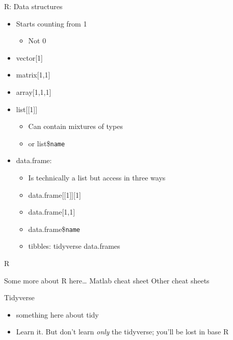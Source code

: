 \documentclass[
  ignorenonframetext,
]{beamer}
\providecommand{\tightlist}{%
  \setlength{\itemsep}{0pt}\setlength{\parskip}{0pt}}
\begin{document}
\begin{frame}[fragile]{R: Data structures}
\protect\hypertarget{r-data-structures}{}

\begin{itemize}
\tightlist
\item
  Starts counting from 1

  \begin{itemize}
  \tightlist
  \item
    Not 0
  \end{itemize}
\item
  vector{[}1{]}
\item
  matrix{[}1,1{]}
\item
  array{[}1,1,1{]}
\item
  list{[}{[}1{]}{]}

  \begin{itemize}
  \tightlist
  \item
    Can contain mixtures of types
  \item
    or list\$\texttt{name}
  \end{itemize}
\item
  data.frame:

  \begin{itemize}
  \tightlist
  \item
    Is technically a list but access in three ways
  \item
    data.frame{[}{[}1{]}{]}{[}1{]}
  \item
    data.frame{[}1,1{]}
  \item
    data.frame\$\texttt{name}
  \item
    tibbles: tidyverse data.frames
  \end{itemize}
\end{itemize}

\end{frame}

\begin{frame}{R}
\protect\hypertarget{r}{}

Some more about R here\ldots{} Matlab cheat sheet Other cheat sheets

\end{frame}

\begin{frame}{Tidyverse}
\protect\hypertarget{tidyverse}{}

\begin{itemize}
\tightlist
\item
  something here about tidy
\item
  Learn it. But don't learn \emph{only} the tidyverse; you'll be lost in
  base R
\end{itemize}

\end{frame}
\end{document}
